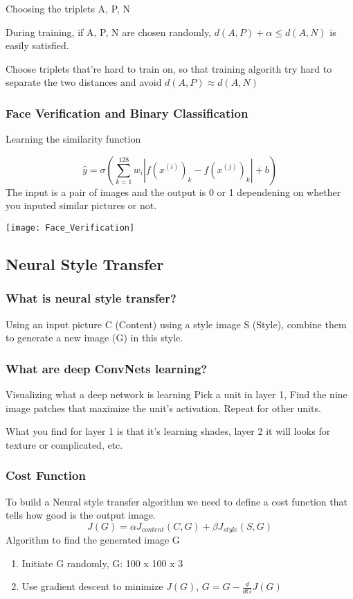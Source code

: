 Choosing the triplets A, P, N

During training, if A, P, N are chosen randomly, $d(A, P) + \alpha \leq d(A, N)$ is easily satisfied.

Choose triplets that're hard to train on, so that training algorith try hard to separate the two distances and avoid $d(A, P) \approx d(A, N)$

\subsubsection{Face Verification and Binary Classification}
Learning the similarity function

\begin{equation}
\hat{y} = \sigma(\sum^{128}_{k=1}w_i \left| f(x^{(i)})_k - f(x^{(j)})_k \right| + b)
\end{equation}
The input is a pair of images and the output is 0 or 1 dependening on whether you inputed similar pictures or not.

\texttt{[image: Face\_Verification]}

\subsection{Neural Style Transfer}
\subsubsection{What is neural style transfer?}
Using an input picture C (Content) using a style image S (Style), combine them to generate a new image (G) in this style.

\subsubsection{What are deep ConvNets learning?}
Visualizing what a deep network is learning
Pick a unit in layer 1, Find the nine image patches that maximize the unit's activation.
Repeat for other units.

What you find for layer 1 is that it's learning shades, layer 2 it will looks for texture or complicated, etc.

\subsubsection{Cost Function}
To build a Neural style transfer algorithm we need to define a cost function that tells how good is the output image.
\begin{equation*}
    J(G) = \alpha J_{content}(C, G) + \beta J_{style} (S, G)
\end{equation*}
Algorithm to find the generated image G
\begin{enumerate}
    \item Initiate G randomly, G: 100 x 100 x 3
    \item Use gradient descent to minimize $J(G)$, $G = G - \frac{d}{dG} J(G)$
\end{enumerate}

